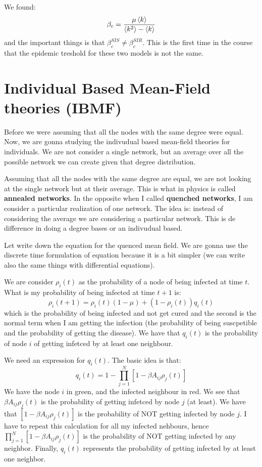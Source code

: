 \documentclass[../main/main.tex]{subfiles}
\begin{document}
We found:
\begin{equation*}
  \beta _c = \frac{\mu \expval{k} }{\expval{k^2} - \expval{k} }
\end{equation*}
and the important things is that \( \beta _c^{SIS} \neq \beta _c^{SIR} \). This is the first time in the course that the epidemic treshold for these two models is not the same.

\section{Individual Based Mean-Field theories (IBMF)}

Before we were assuming that all the nodes with the same degree were equal. Now, we are gonna studying the indivudual based mean-field theories for individuals.
We are not consider a single network, but an average over all the possible network we can create given that degree distribution.

Assuming that all the nodes with the same degree are equal, we are not looking at the single network but at their average. This is what in physics is called \textbf{annealed networks}.
In the opposite when I called \textbf{quenched networks}, I am consider a particular realization of one network. The idea is: instead of considering the average we are considering a particular network. This is de difference in doing a degree bases or an indivudual based.

Let write down the equation for the quenced mean field. We are gonna use the discrete time formulation of equation because it is a bit simpler (we can write also the same things with differential equations).

We are consider \( \rho _i (t) \) as the probability of a node of being infected at time \( t \). What is my probability of being infected at time \( t+1 \) is:
\begin{equation*}
  \rho _i (t+1) = \rho _i(t) (1- \mu ) + (1 - \rho _i(t))q_i(t)
\end{equation*}
which is the probability of being infected and not get cured and the second is the normal term when I am getting the infection (the probability of being suscpetible and the probability of getting the disease).
We have that \( q_i(t) \) is the probability of node \( i \) of getting infetced by at least one neighbour.

We need an expression for \( q_i(t) \). The basic idea is that:
\begin{equation*}
  q_i (t) = 1 - \prod_{j=1}^{N} [1- \beta A_{ij} \rho _j (t)]
\end{equation*}
We have the node \( i \) in green, and the infected neighbour in red. We see that \( \beta A_{ij} \rho _j (t) \) is the probability of getting infetced by node \( j \) (at least). We have that  \( [1- \beta A_{ij} \rho _j (t)] \) is the probability of NOT getting infected by node \( j \). I have to repeat this calculation for all my infected nehbours, hence \( \prod_{j=1}^{N} [1- \beta A_{ij} \rho _j (t)] \) is the probability of NOT getting infected by any neighbor.
Finally, \(   q_i (t) \) represents the probability of getting infected by at least one neighbor.
\end{document}
